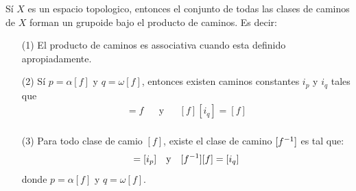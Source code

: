 \begin{theorem}\label{11.34}
    S\'i $X$ es un espacio topologico, entonces el conjunto de todas las clases
    de caminos de  $X$ forman un grupoide bajo el producto de caminos. Es decir:
    \begin{enumerate}
        \item[(1)] El producto de caminos es associativa cuando esta definido
            apropiadamente.

        \item[(2)] S\'i $p=\alpha[f]$ y $q=\omega[f]$, entonces existen caminos
            constantes $i_p$ y $i_q$ tales que
            \begin{align*}
                [i_p][f]=f  &&  \text{y}   &&   [f][i_q]=[f]       \\
            \end{align*}

        \item[(3)] Para todo clase de camio $[f]$, existe el clase de camino
        $[f^{-1}]$ es tal que:
            \begin{align*}
                [f][\inv{f}]=[i_p]  &&  \text{y}    &&  [\inv{f}][f]=[i_q]  \\
            \end{align*}
            donde $p=\alpha[f]$ y $q=\omega[f]$.
    \end{enumerate}
\end{theorem}
